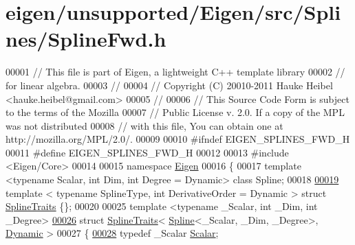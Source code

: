 \hypertarget{eigen_2unsupported_2_eigen_2src_2_splines_2_spline_fwd_8h_source}{}\section{eigen/unsupported/\+Eigen/src/\+Splines/\+Spline\+Fwd.h}
\label{eigen_2unsupported_2_eigen_2src_2_splines_2_spline_fwd_8h_source}

\begin{DoxyCode}
00001 \textcolor{comment}{// This file is part of Eigen, a lightweight C++ template library}
00002 \textcolor{comment}{// for linear algebra.}
00003 \textcolor{comment}{//}
00004 \textcolor{comment}{// Copyright (C) 20010-2011 Hauke Heibel <hauke.heibel@gmail.com>}
00005 \textcolor{comment}{//}
00006 \textcolor{comment}{// This Source Code Form is subject to the terms of the Mozilla}
00007 \textcolor{comment}{// Public License v. 2.0. If a copy of the MPL was not distributed}
00008 \textcolor{comment}{// with this file, You can obtain one at http://mozilla.org/MPL/2.0/.}
00009 
00010 \textcolor{preprocessor}{#ifndef EIGEN\_SPLINES\_FWD\_H}
00011 \textcolor{preprocessor}{#define EIGEN\_SPLINES\_FWD\_H}
00012 
00013 \textcolor{preprocessor}{#include <Eigen/Core>}
00014 
00015 \textcolor{keyword}{namespace }\hyperlink{namespace_eigen}{Eigen}
00016 \{
00017     \textcolor{keyword}{template} <\textcolor{keyword}{typename} Scalar, \textcolor{keywordtype}{int} Dim, \textcolor{keywordtype}{int} Degree = Dynamic> \textcolor{keyword}{class }Spline;
00018 
\hyperlink{struct_eigen_1_1_spline_traits}{00019}     \textcolor{keyword}{template} < \textcolor{keyword}{typename} SplineType, \textcolor{keywordtype}{int} DerivativeOrder = Dynamic > \textcolor{keyword}{struct }
      \hyperlink{struct_eigen_1_1_spline_traits}{SplineTraits} \{\};
00020 
00025     \textcolor{keyword}{template} <\textcolor{keyword}{typename} \_Scalar, \textcolor{keywordtype}{int} \_Dim, \textcolor{keywordtype}{int} \_Degree>
\hyperlink{group___splines___module}{00026}     \textcolor{keyword}{struct }\hyperlink{struct_eigen_1_1_spline_traits}{SplineTraits}< \hyperlink{group___splines___module_class_eigen_1_1_spline}{Spline}<\_Scalar, \_Dim, \_Degree>, 
      \hyperlink{namespace_eigen_ad81fa7195215a0ce30017dfac309f0b2}{Dynamic} >
00027     \{
\hyperlink{group___splines___module_aa440dee6a559821c867c94ee4bbf60f3}{00028}       \textcolor{keyword}{typedef} \_Scalar \hyperlink{group___splines___module_aa440dee6a559821c867c94ee4bbf60f3}{Scalar}; 

\end{DoxyCode}
